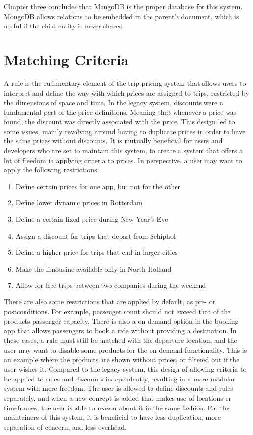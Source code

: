 Chapter three concludes that MongoDB is the proper database for this system. MongoDB allows relations to be embedded in the parent's document, which is useful if the child entity is never shared.

\section{Matching Criteria}
A rule is the rudimentary element of the trip pricing system that allows users to interpret and define the way with which prices are assigned to trips, restricted by the dimensions of space and time. In the legacy system, discounts were a fundamental part of the price definitions. Meaning that whenever a price was found, the discount was directly associated with the price. This design led to some issues, mainly revolving around having to duplicate prices in order to have the same prices without discounts. It is mutually beneficial for users and developers who are set to maintain this system, to create a system that offers a lot of freedom in applying criteria to prices. In perspective, a user may want to apply the following restrictions:

\begin{enumerate}
	\item Define certain prices for one app, but not for the other
	\item Define lower dynamic prices in Rotterdam
	\item Define a certain fixed price during New Year's Eve
	\item Assign a discount for trips that depart from Schiphol
	\item Define a higher price for trips that end in larger cities
	\item Make the limousine available only in North Holland
	\item Allow for free trips between two companies during the weekend
\end{enumerate}

There are also some restrictions that are applied by default, as pre- or  postconditions. For example, passenger count should not exceed that of the products passenger capacity. There is also a on demand option in the booking app that allows passengers to book a ride without providing a destination. In these cases, a rule must still be matched with the departure location, and the user may want to disable some products for the on-demand functionality. This is an example where the products are shown without prices, or filtered out if the user wishes it. Compared to the legacy system, this design of allowing criteria to be applied to rules and discounts independently, resulting in a more modular system with more freedom. The user is allowed to define discounts and rules separately, and when a new concept is added that makes use of locations or timeframes, the user is able to reason about it in the same fashion. For the maintainers of this system, it is beneficial to have less duplication, more separation of concern, and less overhead.

